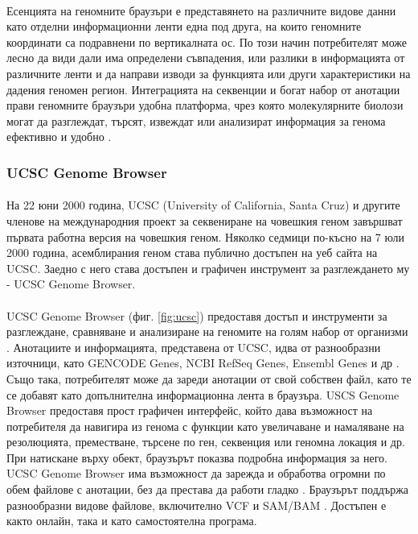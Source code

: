 \documentclass[pdftex,cyrillic,14pt,a4page,twoside,openright]{extreport}
\begin{document}
\paragraph{}
Есенцията на геномните браузъри е представянето на различните видове данни като отделни информационни ленти една под друга, на които геномните координати са подравнени по вертикалната ос. По този начин потребителят може лесно да види дали има определени съвпадения, или разлики в информацията от различните ленти и да направи изводи за функцията или други характеристики на дадения геномен регион. Интеграцията на секвенции и богат набор от анотации прави геномните браузъри удобна платформа, чрез която молекулярните биолози могат да разглеждат, търсят, извеждат или анализират информация за генома ефективно и удобно \cite{wang2013brief}.

\subsubsection{UCSC Genome Browser}
\paragraph{}
На 22 юни 2000 година, UCSC (University of California, Santa Cruz) и другите членове на международния проект за секвениране на човешкия геном завършват първата работна версия на човешкия геном. Няколко седмици по-късно на 7 юли 2000 година, асемблирания геном става публично достъпен на уеб сайта на UCSC. Заедно с него става достъпен и графичен инструмент за разглеждането му - UCSC Genome Browser.

\paragraph{}
UCSC Genome Browser (фиг. \ref{fig:ucsc}) предоставя достъп и инструменти за разглеждане, сравняване и анализиране на геномите на голям набор от организми \cite{fujita2011}. Анотациите и информацията, представена от UCSC, идва от разнообразни източници, като GENCODE Genes, NCBI RefSeq Genes, Ensembl Genes и др \cite{navarro2021}. Също така, потребителят може да зареди анотации от свой собствен файл, като те се добавят като допълнителна информационна лента в браузъра. USCS Genome Browser предоставя прост графичен интерфейс, който дава възможност на потребителя да навигира из генома с функции като увеличаване и намаляване на резолюцията, преместване, търсене по ген, секвенция или геномна локация и др. При натискане върху обект, браузърът показва подробна информация за него. UCSC Genome Browser има възможност да зарежда и обработва огромни по обем файлове с анотации, без да престава да работи гладко \cite{kent2002human}. Браузърът поддържа разнообразни видове файлове, включително VCF \cite{navarro2021} и SAM/BAM \cite{fujita2011}. Достъпен е както онлайн, така и като самостоятелна програма.
\end{document}
